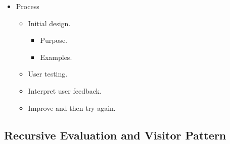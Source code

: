 \documentclass{article}
\begin{document}
\begin{itemize}
    \item Process
    \begin{itemize}
        \item Initial design.
        \begin{itemize}
            \item Purpose.
            \item Examples.
        \end{itemize}
        \item User testing.
        \item Interpret user feedback.
        \item Improve and then try again.
    \end{itemize}
\end{itemize}

\subsection{Recursive Evaluation and Visitor Pattern}
\end{document}
